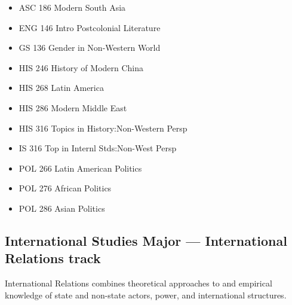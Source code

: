 \documentclass[
  letterpaper,
]{scrbook}
\providecommand{\tightlist}{%
  \setlength{\itemsep}{0pt}\setlength{\parskip}{0pt}}
\begin{document}
\begin{enumerate}
  \begin{itemize}
  \tightlist
  \item
    ASC 186 Modern South Asia
  \item
    ENG 146 Intro Postcolonial Literature
  \item
    GS 136 Gender in Non-Western World
  \item
    HIS 246 History of Modern China
  \item
    HIS 268 Latin America
  \item
    HIS 286 Modern Middle East
  \item
    HIS 316 Topics in History:Non-Western Persp
  \item
    IS 316 Top in Internl Stds:Non-West Persp
  \item
    POL 266 Latin American Politics
  \item
    POL 276 African Politics
  \item
    POL 286 Asian Politics
  \end{itemize}
\end{enumerate}

\subsection{International Studies Major --- International Relations
track}\label{international-studies-major-international-relations-track}

International Relations combines theoretical approaches to and empirical
knowledge of state and non-state actors, power, and international
structures.
\end{document}
